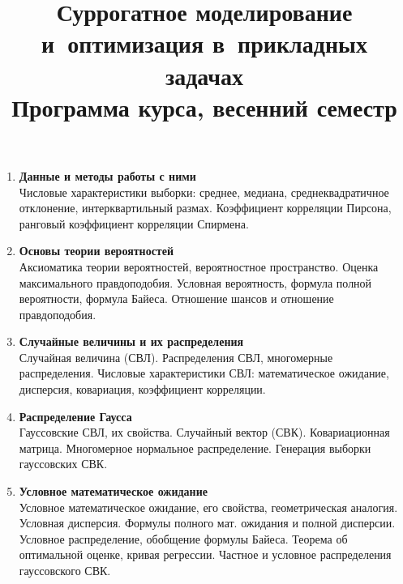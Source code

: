 \documentclass[12pt,oneside,openany]{article}
\begin{document}
\title{
  \large
  \textbf{Суррогатное моделирование и~оптимизация в~прикладных задачах} \\
  Программа курса, весенний семестр
}

\author{}
\date{}

\maketitle
\thispagestyle{empty}

\vspace{-10ex}


\begin{enumerate}

  \item \textbf{Данные и методы работы с ними} \\
  Числовые характеристики выборки: среднее, медиана, среднеквадратичное отклонение, интерквартильный размах. Коэффициент корреляции Пирсона, ранговый коэффициент корреляции Спирмена.

  \item \textbf{Основы теории вероятностей} \\
  Аксиоматика теории вероятностей, вероятностное пространство. Оценка максимального правдоподобия.
  Условная вероятность, формула полной вероятности, формула Байеса. Отношение шансов и отношение правдоподобия. 

  \item \textbf{Случайные величины и их распределения} \\
  Случайная величина (СВЛ). Распределения СВЛ, многомерные распределения. Числовые характеристики СВЛ: математическое ожидание, дисперсия, ковариация, коэффициент корреляции.

  \item \textbf{Распределение Гаусса} \\
  Гауссовские СВЛ, их свойства. Случайный вектор (СВК).
  Ковариационная матрица. Многомерное нормальное распределение. Генерация выборки гауссовских СВК.

  \item \textbf{Условное математическое ожидание} \\
  Условное математическое ожидание, его свойства, геометрическая аналогия. Условная дисперсия. Формулы полного мат. ожидания и
  полной дисперсии. Условное распределение, обобщение формулы Байеса. Теорема об оптимальной оценке, кривая регрессии. Частное и условное распределения гауссовского СВК.


\end{enumerate}
\end{document}

